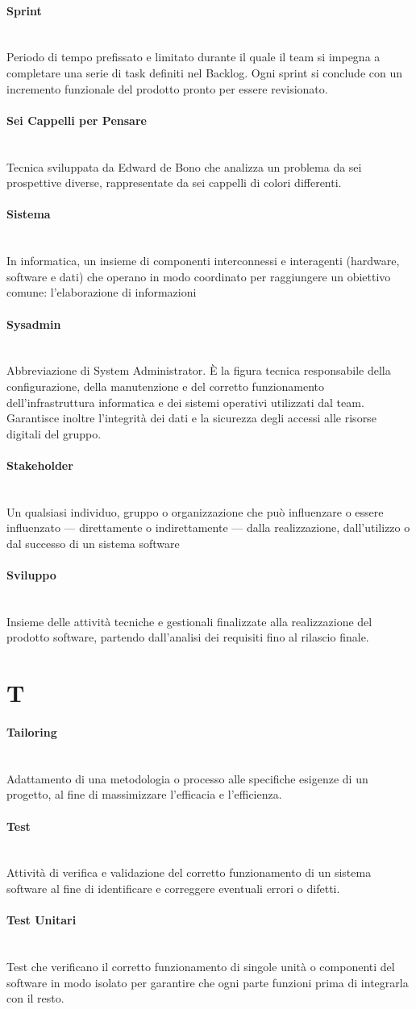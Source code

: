 \documentclass[a4paper, 10pt, colorlinks=true, linkcolor=black, urlcolor=blue, citecolor=blue, hidelinks]{article}
\newcommand{\glossaryterm}[2]{
    \paragraph{#1 \label{term:#1}} \mbox{} \\
    #2
    \vspace{0.5em}
}
\begin{document}
\glossaryterm{Sprint}{Periodo di tempo prefissato e limitato durante il quale il team si impegna a completare una serie di task definiti nel Backlog. Ogni sprint si conclude con un incremento funzionale del prodotto pronto per essere revisionato.}

\glossaryterm{Sei Cappelli per Pensare}{Tecnica sviluppata da Edward de Bono che analizza un problema da sei prospettive diverse, rappresentate da sei cappelli di colori differenti.}

\glossaryterm{Sistema}{In informatica, un insieme di componenti interconnessi e interagenti (hardware, software e dati) che operano in modo coordinato per raggiungere un obiettivo comune: l'elaborazione di informazioni}

\glossaryterm{Sysadmin}{Abbreviazione di System Administrator. È la figura tecnica responsabile della configurazione, della manutenzione e del corretto funzionamento dell'infrastruttura informatica e dei sistemi operativi utilizzati dal team. Garantisce inoltre l'integrità dei dati e la sicurezza degli accessi alle risorse digitali del gruppo.}

\glossaryterm{Stakeholder}{Un qualsiasi individuo, gruppo o organizzazione che può influenzare o essere influenzato — direttamente o indirettamente — dalla realizzazione, dall'utilizzo o dal successo di un sistema software}

\glossaryterm{Sviluppo}{Insieme delle attività tecniche e gestionali finalizzate alla realizzazione del prodotto software, partendo dall'analisi dei requisiti fino al rilascio finale.}

\newpage

\section*{T}

\glossaryterm{Tailoring}{Adattamento di una metodologia o processo alle specifiche esigenze di un progetto, al fine di massimizzare l'efficacia e l'efficienza.}

\glossaryterm{Test}{Attività di verifica e validazione del corretto funzionamento di un sistema software al fine di identificare e correggere eventuali errori o difetti.}

\glossaryterm{Test Unitari}{Test che verificano il corretto funzionamento di singole unità o componenti del software in modo isolato per garantire che ogni parte funzioni prima di integrarla con il resto.}
\end{document}
